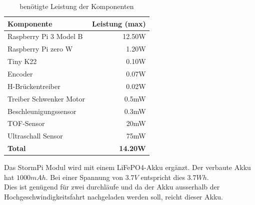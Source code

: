 \documentclass[../../main.tex]{subfiles}
\begin{document}
    \begin{table}[H] \centering
        \begin{tabular}{|l|r|}
        \hline
        \textbf{Komponente}     & \textbf{Leistung (max)} \\ \hline
        Raspberry Pi 3 Model B  & 12.50W \nocite{PiShopPi3ModelBp}                 \\ \hline
        Raspberry Pi zero W     & 1.20W \nocite{RaspiTvPiZeroPower}                   \\ \hline
        Tiny K22                & 0.10W \nocite{K22DataSheet}       \\ \hline
        Encoder                 & 0.07W                   \\ \hline
        H-Brückentreiber        & 0.02W                   \\ \hline
        Treiber Schwenker Motor & 0.5mW                   \\ \hline
        Beschleunigungssensor   & 0.3mW                   \\ \hline
        TOF-Sensor              & 20mW                    \\ \hline
        Ultraschall Sensor      & 75mW                    \\ \hline
        \textbf{Total}          & \textbf{14.20W}         \\ \hline
        \end{tabular}
        \caption{benötigte Leistung der Komponenten}
        \label{tab:et_komponente_leistung}
    \end{table}

    Das StormPi Modul wird mit einem LiFePO4-Akku ergänzt. Der verbaute Akku hat $1000mAh$. Bei einer Spannung von $3.7V$ entspricht dies $3.7Wh$. \\
    Dies ist genügend für zwei durchläufe und da der Akku ausserhalb der Hochgeschwindigkeitsfahrt nachgeladen werden soll, reicht dieser Akku.
\end{document}
